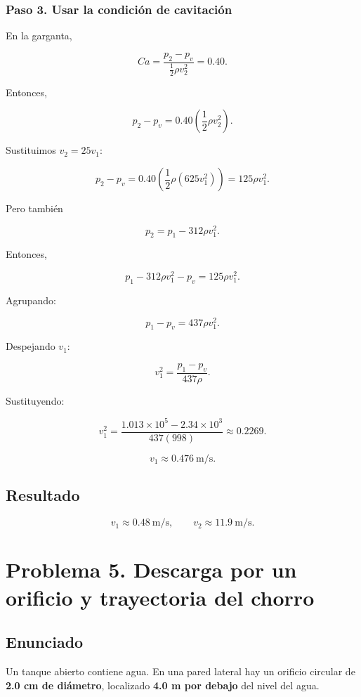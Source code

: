 \documentclass[
  letterpaper,
  DIV=11,
  numbers=noendperiod]{scrreprt}
\begin{document}
\subsection{Paso 3. Usar la condición de
cavitación}\label{paso-3.-usar-la-condiciuxf3n-de-cavitaciuxf3n}

En la garganta,

\[
Ca = \frac{p_2-p_v}{\tfrac12\rho v_2^2} = 0.40.
\]

Entonces,

\[
p_2 - p_v = 0.40\left(\frac12\rho v_2^2\right).
\]

Sustituimos \(v_2=25v_1\):

\[
p_2 - p_v = 0.40\left(\frac12\rho (625v_1^2)\right)=125\rho v_1^2.
\]

Pero también

\[
p_2 = p_1 - 312\rho v_1^2.
\]

Entonces,

\[
p_1 - 312\rho v_1^2 - p_v = 125\rho v_1^2.
\]

Agrupando:

\[
p_1 - p_v = 437\rho v_1^2.
\]

Despejando \(v_1\):

\[
v_1^2 = \frac{p_1-p_v}{437\rho}.
\]

Sustituyendo:

\[
v_1^2 = \frac{1.013\times10^5 - 2.34\times10^3}{437(998)} \approx 0.2269.
\]

\[
v_1 \approx 0.476\ \text{m/s}.
\]

\section{Resultado}\label{resultado-2}

\[
\boxed{v_1\approx 0.48\ \text{m/s}},
\qquad
\boxed{v_2\approx 11.9\ \text{m/s}}.
\]

\chapter{Problema 5. Descarga por un orificio y trayectoria del
chorro}\label{problema-5.-descarga-por-un-orificio-y-trayectoria-del-chorro}

\section{Enunciado}\label{enunciado-4}

Un tanque abierto contiene agua. En una pared lateral hay un orificio
circular de \textbf{2.0 cm de diámetro}, localizado \textbf{4.0 m por
debajo} del nivel del agua.
\end{document}
